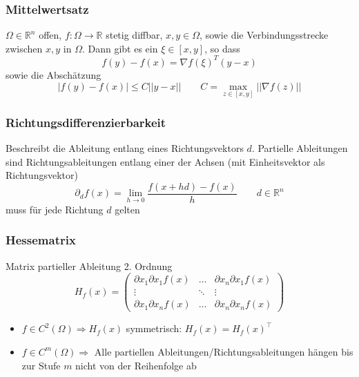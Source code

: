 \begin{sectionbox}
    \subsubsection{Mittelwertsatz}
    $\Omega \in \mathbb R^n$ offen, $f:\Omega \rightarrow \mathbb R$ stetig diffbar, $x,y \in \Omega$, sowie die Verbindungsstrecke zwischen $x,y$ in $\Omega$.
    Dann gibt es ein $\xi\in [x,y]$, so dass
    \begin{equation*}
        f(y)-f(x)=\nabla f(\xi)^T(y-x)
    \end{equation*}
    sowie die Abschätzung
    \begin{equation*}
        |f(y)-f(x)| \le C||y-x|| \qquad C=\max_{z \in [x,y]}||\nabla f(z)||
    \end{equation*}
\end{sectionbox}

\subsubsection{Richtungsdifferenzierbarkeit}
Beschreibt die Ableitung entlang eines Richtungsvektors $d$. Partielle Ableitungen sind Richtungsableitungen entlang einer der Achsen (mit Einheitsvektor als Richtungsvektor)
\begin{equation*}
    \partial_df(x)=\lim_{h\rightarrow 0}\frac{f(x+hd)-f(x)}{h} \qquad d \in \mathbb R^n
\end{equation*}
muss für jede Richtung $d$ gelten

\subsubsection{Hessematrix}
Matrix partieller Ableitung 2. Ordnung
\begin{equation*}
    H_f(x)=\begin{pmatrix}\partial x_1\partial x_1 f(x)  & \dots  & \partial x_n \partial x_1 f(x) \\
                   \vdots                         & \ddots & \vdots                         \\
                   \partial x_1 \partial x_n f(x) & \dots  & \partial x_n \partial x_n f(x)\end{pmatrix}
\end{equation*}

\begin{sectionbox}
    \begin{itemize}
        \item $f \in C^2(\Omega) \Rightarrow H_f(x)$ symmetrisch: $H_f(x)=H_f(x)^\top$
        \item $f \in C^m(\Omega) \Rightarrow$ Alle partiellen Ableitungen/Richtungsableitungen hängen bis zur Stufe $m$ nicht von der Reihenfolge ab
    \end{itemize}
\end{sectionbox}

